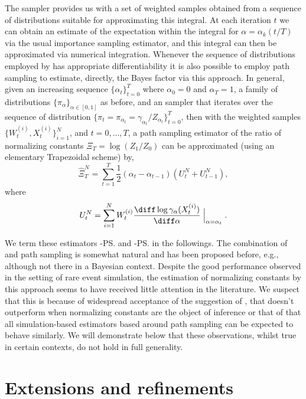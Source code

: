 The \smc sampler provides us with a set of weighted samples obtained from a sequence of distributions suitable for approximating this integral. At each iteration $t$ we can obtain an estimate of the expectation within the integral for $\alpha = \alpha_k(t/T)$ via the usual importance sampling estimator, and this integral can then be approximated via numerical integration. Whenever the sequence of distributions employed by \smc[3] has appropriate differentiability it is also possible to employ path sampling to estimate, directly, the Bayes factor via this approach. In general, given an increasing sequence $\{\alpha_t\}_{t=0}^T$ where $\alpha_0 = 0$ and $\alpha_T = 1$, a family of distributions $\{\pi_{\alpha}\}_{\alpha\in[0,1]}$ as before, and an \smc sampler that iterates over the sequence of distribution $\{\pi_t = \pi_{\alpha_t} = \gamma_{\alpha_t}/Z_{\alpha_t}\}_{t=0}^T$, then with the weighted samples $\{W_t^{(i)},X_t^{(i)}\}_{i=1}^N$, and $t = 0,\dots,T$, a path sampling estimator of the ratio of normalizing constants $\Xi_T = \log(Z_1/Z_0)$ can be approximated (using an elementary Trapezoidal scheme) by,
\begin{equation}
  \hat\Xi_{T}^{N} = \sum_{t=1}^T
  \frac{1}{2}(\alpha_t - \alpha_{t - 1})(U_t^N + U_{t-1}^N),
  \label{eq:path_est}
\end{equation}
where
\begin{equation}
  U_t^N = \sum_{i=1}^N
  W_t^{(i)} \frac{\diff\log\gamma_{\alpha}(X_t^{(i)})}{\diff\alpha}
  \Bigm|_{\alpha = \alpha_t}.
\end{equation}

We term these estimators \smc[2]-\ps and \smc[3]-\ps in the followings. The combination of \smc and path sampling is somewhat natural and has been proposed before, e.g., \cite{Johansen:2006wm} although not there in a Bayesian context. Despite the good performance observed in the setting of rare event simulation, the estimation of normalizing constants by this approach seems to have received little attention in the literature. We suspect that this is because of widespread acceptance of the suggestion of \cite{DelMoral:2006hc}, that \smc doesn't outperform \ais when normalizing constants are the object of inference or that of \cite{Calderhead:2009bd} that all simulation-based estimators based around path sampling can be expected to behave similarly. We will demonstrate below that these observations, whilst true in certain contexts, do not hold in full generality.

\section{Extensions and refinements}
\label{sec:Extensions and refinements}

